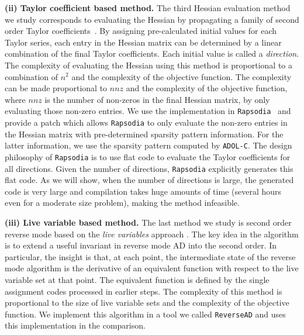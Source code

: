 \documentclass[11pt, a4paper, english]{article}
\begin{document}
{\bf (ii) Taylor coefficient based method. } 
The third Hessian evaluation method  we study  corresponds to evaluating the Hessian by propagating a family of second order Taylor coefficients~\cite{griewank2000evaluating}. 
By assigning pre-calculated initial values for each Taylor series, each entry in the Hessian matrix  can be determined by a linear combination of the final Taylor coefficients. Each initial value is called a {\em direction}.
The complexity of evaluating the Hessian using this method is proportional to a combination of $n^2$ and the complexity of the objective function. The complexity can be made proportional to $nnz$ and the complexity of the objective function, where $nnz$ is the number of non-zeros in the final Hessian matrix, by only evaluating those non-zero entries.
We use the implementation in {\tt Rapsodia}~\cite{charpentier2009fast} and provide a patch which allows {\tt Rapsodia} to only evaluate the non-zero entries in the Hessian matrix with pre-determined sparsity pattern information. For the latter information, we use the sparsity pattern computed by {\tt ADOL-C}. The design philosophy of {\tt Rapsodia} is to use flat code to evaluate the Taylor coefficients for all directions. Given the number of directions, {\tt Rapsodia} explicitly generates this flat code. As we will show, when the number of directions is large, the generated code is very large and compilation takes huge amounts of time (several hours even for a moderate size problem), making the method infeasible. 

{\bf (iii) Live variable based method. }
The last method we study is second order reverse mode based on the {\em live variables} approach \cite{wang2016capitalizing}. The key idea in the algorithm is to extend a useful invariant in reverse mode AD into the second order. In particular, the insight is that, at each point, the intermediate state of the reverse mode algorithm is the derivative of an equivalent function with respect to the live variable set at that point. The equivalent function is defined by the single assignment codes processed in earlier steps. The complexity of this method is proportional to the size of live variable sets and the complexity of the objective function. We implement this algorithm in a tool we called {\tt ReverseAD} and uses this implementation in the comparison.
\end{document}
